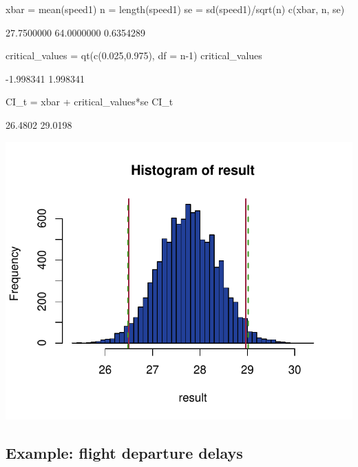 \documentclass[a4paper]{article}
\begin{document}
\begin{Schunk}
\begin{Sinput}
xbar = mean(speed1)
n = length(speed1)
se = sd(speed1)/sqrt(n)
c(xbar, n, se)
\end{Sinput}
\begin{Soutput}
[1] 27.7500000 64.0000000  0.6354289
\end{Soutput}
\begin{Sinput}
critical_values = qt(c(0.025,0.975), df = n-1)
critical_values
\end{Sinput}
\begin{Soutput}
[1] -1.998341  1.998341
\end{Soutput}
\begin{Sinput}
CI_t = xbar + critical_values*se
CI_t
\end{Sinput}
\begin{Soutput}
[1] 26.4802 29.0198
\end{Soutput}


{\centering \includegraphics[width=\maxwidth]{figure/listings-unnamed-chunk-173-1} 

}

\end{Schunk}
\subsection{Example: flight departure delays}
\end{document}
